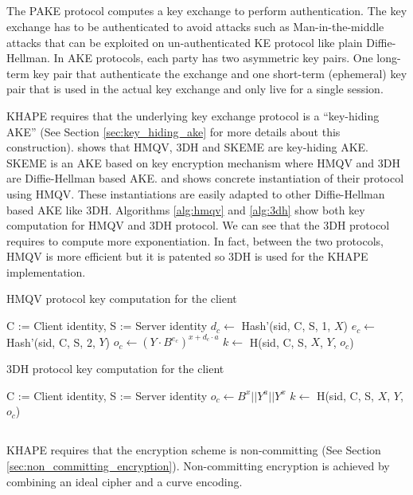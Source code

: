 ﻿\documentclass[../report.tex]{subfiles}
\begin{document}
\subsection{}
The PAKE protocol computes a key exchange to perform authentication. The key exchange has to be authenticated to avoid attacks such as Man-in-the-middle attacks that can be exploited on un-authenticated KE protocol like plain Diffie-Hellman.
In AKE protocols, each party has two asymmetric key pairs.
One long-term key pair that authenticate the exchange and one short-term (ephemeral) key pair that is used in the actual key exchange and only live for a single session.

KHAPE requires that the underlying key exchange protocol is a ``key-hiding AKE'' (See Section \ref{sec:key_hiding_ake} for more details about this construction).
\cite{KHAPE_Paper} shows that HMQV, 3DH and SKEME are key-hiding AKE.
SKEME is an AKE based on key encryption mechanism where HMQV and 3DH are Diffie-Hellman based AKE.
\cite{OPAQUE_Paper} and \cite{KHAPE_Paper} shows concrete instantiation of their protocol using HMQV. These instantiations are easily adapted to other Diffie-Hellman based AKE like 3DH.
Algorithms \ref{alg:hmqv} and \ref{alg:3dh} show both key computation for HMQV and 3DH protocol. We can see that the 3DH protocol requires to compute more exponentiation.
In fact, between the two protocols, HMQV is more efficient but it is patented so 3DH is used for the KHAPE implementation.
\begin{algorithm}
\caption{HMQV protocol key computation for the client}
\label{alg:hmqv}
\begin{algorithmic}
\Require C := Client identity, S := Server identity
\State $d_c \gets$ Hash'(sid, C, S, 1, $X$)
\State $e_c \gets$ Hash'(sid, C, S, 2, $Y$)
\State $o_c \gets (Y \cdot B^{e_c})^{x+d_c \cdot a}$
\State $k \gets$ H(sid, C, S, $X$, $Y$, $o_c$)
\end{algorithmic}
\end{algorithm}
\begin{algorithm}
\caption{3DH protocol key computation for the client}
\label{alg:3dh}
\begin{algorithmic}
\Require C := Client identity, S := Server identity
\State $o_c \gets B^x || Y^a || Y^x$
\State $k \gets$ H(sid, C, S, $X$, $Y$, $o_c$)
\end{algorithmic}
\end{algorithm}



\subsection{}
KHAPE requires that the encryption scheme is non-committing (See Section \ref{sec:non_committing_encryption}).
Non-committing encryption is achieved by combining an ideal cipher and a curve encoding.
\end{document}
